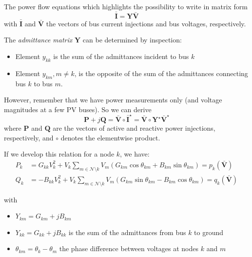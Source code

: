 \begin{frame}[allowframebreaks]{The power flow equations}
    which highlights the possibility to write in matrix form
    \begin{equation}
        \mathbf{\bar{I}} = \mathbf{Y} \mathbf{\bar{V}} \label{eq:bus_inj_mat}
    \end{equation}
    with $\mathbf{\bar{I}}$ and $\mathbf{\bar{V}}$ the vectors of bus current injections and bus voltages, respectively.
    
    \newpage
    The \textit{admittance matrix} $\mathbf{Y}$ can be determined by inspection:
    \begin{itemize}
        \item Element $y_{kk}$ is the sum of the admittances incident to bus $k$
        \item Element $y_{km}, m \neq k$, is the opposite of the sum of the admittances connecting bus $k$ to bus $m$.
    \end{itemize}

    However, remember that we have power measurements only (and voltage magnitudes at a few PV buses). So we can derive
    \begin{equation}
        \mathbf{P} +j \mathbf{Q} = \mathbf{\bar{V}} \circ \mathbf{\bar{I}}^{\star}
        = \mathbf{\bar{V}} \circ \mathbf{Y}^{\star} \mathbf{\bar{V}}^{\star} \label{eq:pf}
    \end{equation}
    where $\mathbf{P}$ and $\mathbf{Q}$ are the vectors of active and reactive power injections, respectively, and $\circ$ denotes the elementwise product.
    
    If we develop this relation for a node $k$, we have:
    \begin{align*}
        P_k &= G_{kk} V_k^2  + V_k \sum_{m \in \mathcal{N} \setminus k} V_m(G_{km} \cos\theta_{km} + B_{km} \sin\theta_{km}) = p_k(\mathbf{\bar{V}}) \\
        Q_k &= -B_{kk} V_k^2 + V_k \sum_{m \in \mathcal{N} \setminus k} V_m(G_{km} \sin\theta_{km} - B_{km} \cos\theta_{km}) = q_k(\mathbf{\bar{V}})
    \end{align*}
   
    with
    \begin{itemize}
        \item $Y_{km} = G_{km} + j B_{km}$
        \item $Y_{kk} = G_{kk} + j B_{kk}$ is the sum of the admittances from bus $k$ to ground
        \item $\theta_{km} = \theta_{k} - \theta_{m}$ the phase difference between voltages at nodes $k$ and $m$
    \end{itemize}
\end{frame}

